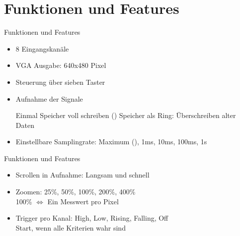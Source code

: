 \section{Funktionen und Features}
\begin{frame}[<+->]{Funktionen und Features}
    \begin{itemize}
        \item 8 Eingangskanäle
        \item VGA Ausgabe: 640x480 Pixel
        \item Steuerung über sieben Taster
        \item Aufnahme der Signale
            \begin{itemize}
                \smallitem Einmal Speicher voll schreiben ()
                \smallitem Speicher als Ring: Überschreiben alter Daten
            \end{itemize}
        \item Einstellbare Samplingrate: Maximum (), 1ms, 10ms, 100ms, 1s
    \end{itemize}
\end{frame}
\begin{frame}[<+->]{Funktionen und Features}
    \begin{itemize}
        \item Scrollen in Aufnahme: Langsam und schnell
        \item Zoomen: 25\%, 50\%, 100\%, 200\%, 400\% \\
            100\% $\Leftrightarrow$ Ein Messwert pro Pixel
        \item Trigger pro Kanal: High, Low, Rising, Falling, Off \\
            Start, wenn alle Kriterien wahr sind
    \end{itemize}
\end{frame}
